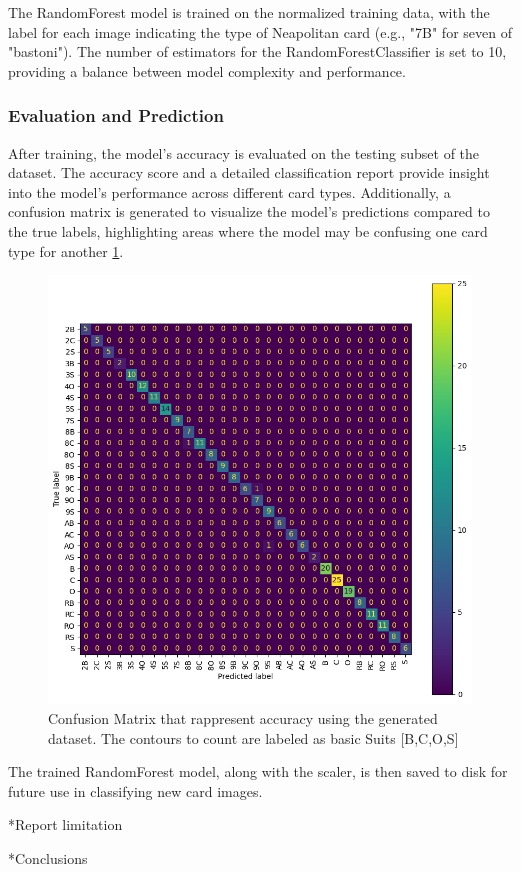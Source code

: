 \documentclass[twocolumn, a4paper,10pt]{article}
\makeatletter
\renewcommand\section{\@startsection{section}{1}{\z@}{3pt}{3pt}{\normalfont\large\bfseries}}
\makeatother
\begin{document}
The RandomForest model is trained on the normalized training data, with the label for each image indicating the type of Neapolitan card (e.g., "7B" for seven of "bastoni"). The number of estimators for the RandomForestClassifier is set to 10, providing a balance between model complexity and performance.

\subsubsection*{Evaluation and Prediction}
After training, the model's accuracy is evaluated on the testing subset of the dataset. The accuracy score and a detailed classification report provide insight into the model's performance across different card types. Additionally, a confusion matrix is generated to visualize the model's predictions compared to the true labels, highlighting areas where the model may be confusing one card type for another \ref{fig:c_matrix}.

\begin{figure}
  \centering
  \includegraphics[scale=0.4]{img/confusionMatrix.png}
  \caption{Confusion Matrix that rappresent accuracy using the generated dataset. The contours to count are labeled as basic Suits [B,C,O,S]}
  \label{fig:c_matrix}
\end{figure}

The trained RandomForest model, along with the scaler, is then saved to disk for future use in classifying new card images.

\section*{Report limitation}

\section*{Conclusions}

\nocite{*}
\def\biblsectioniographystyle{plainnat}


\newpage
\onecolumn
\end{document}
